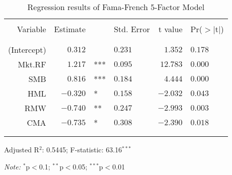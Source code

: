 \begin{table}[!htbp] \centering 
    \caption{Regression results of Fama-French 5-Factor Model} 
    \label{ff_5_factors_results} 
    \begin{threeparttable}
        \begin{tabular*}{\textwidth}{@{\extracolsep{\fill}}rrllrl} 
            \\[-1.8ex] 
            \hline
            \hline
            \\[-1.8ex] 
            Variable & Estimate & & Std. Error & t value & Pr($> |$t$|$) \\ 
            \\[-1.8ex] 
            \hline
            \\[-1.8ex] 
            (Intercept) & $0.312$ & & $0.231$ & $1.352$ & $0.178$ \\ 
            Mkt.RF & $1.217$  & *** & $0.095$ & $12.783$ & $0.000$ \\ 
            SMB    & $0.816$  & *** & $0.184$ & $4.444$  & $0.000$ \\ 
            HML    & $-0.320$ & *   & $0.158$ & $-2.032$ & $0.043$ \\ 
            RMW    & $-0.740$ & **  & $0.247$ & $-2.993$ & $0.003$ \\ 
            CMA    & $-0.735$ & *   & $0.308$ & $-2.390$ & $0.018$ \\ 
            \\[-1.8ex] 
            \hline
            \\[-1.8ex] 
        \end{tabular*} 
        \begin{tablenotes} 
            \item Adjusted R$^{2}$:  0.5445; F-statistic: 63.16$^{***}$
            \item \textit{Note:} $^{*}$p$<$0.1; $^{**}$p$<$0.05; $^{***}$p$<$0.01
        \end{tablenotes} 
    \end{threeparttable}
\end{table} 
